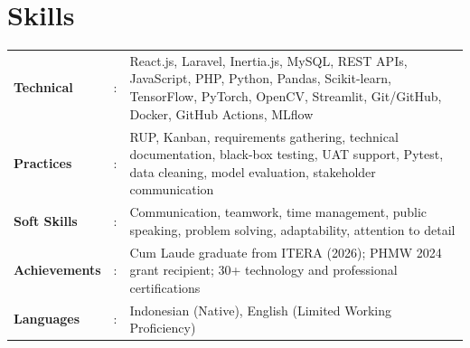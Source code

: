 \section{Skills}
\noindent
\begin{tabularx}{\textwidth}{@{}l @{\hspace{0.3em}} c @{\hspace{0.5em}} X@{}}
	\textbf{Technical} & : & React.js, Laravel, Inertia.js, MySQL, REST APIs, JavaScript, PHP, Python, Pandas, Scikit-learn, TensorFlow, PyTorch, OpenCV, Streamlit, Git/GitHub, Docker, GitHub Actions, MLflow \\
	\textbf{Practices} & : & RUP, Kanban, requirements gathering, technical documentation, black-box testing, UAT support, Pytest, data cleaning, model evaluation, stakeholder communication \\
	\textbf{Soft Skills} & : & Communication, teamwork, time management, public speaking, problem solving, adaptability, attention to detail \\
	\textbf{Achievements} & : & Cum Laude graduate from ITERA (2026); PHMW 2024 grant recipient; 30+ technology and professional certifications \\
	\textbf{Languages}   & : & Indonesian (Native), English (Limited Working Proficiency)
\end{tabularx}
